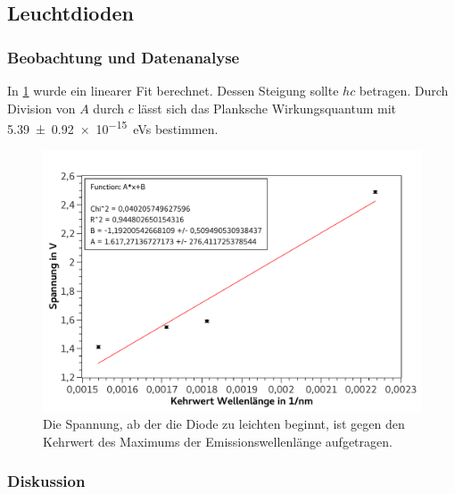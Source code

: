 \documentclass[
	a4paper,
	12pt,
	pagesize,
	ngerman
]{scrartcl}
\begin{document}
	\subsection{Leuchtdioden}
	\subsubsection{Beobachtung und Datenanalyse}
	In \cref{fig_led} wurde ein linearer Fit berechnet. 
	Dessen Steigung sollte $hc$ betragen.
	Durch Division von $A$ durch $c$ lässt sich das Planksche Wirkungsquantum mit \SI{5,39 +- 0,92 e-15}{eVs} bestimmen.

	\begin{figure}[H] 
		\includegraphics[width=1\textwidth]{fig_led} 
		\centering
		\caption{Die Spannung, ab der die Diode zu leichten beginnt, ist gegen den Kehrwert des Maximums der Emissionswellenlänge aufgetragen.}
		\label{fig_led}
		\centering
	\end{figure}	

	
	\subsubsection{Diskussion}
	
	
	
\end{document}
